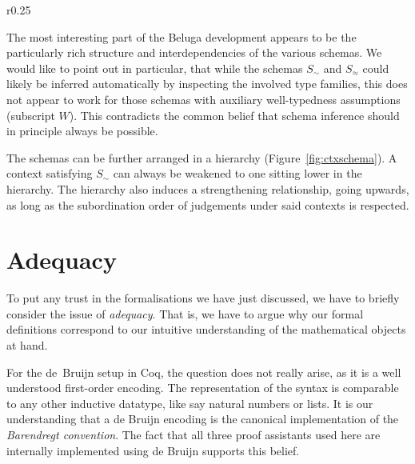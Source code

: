 \documentclass[a4paper,UKenglish]{lipics-v2016}
\newcommand{\tyr}{\mathrel{\sim}}
\newcommand{\tmr}{\mathrel{\approx}}
\theoremstyle{plain}
\begin{document}
\begin{wrapfigure}{r}{0.25\textwidth}
  \centering
  \vspace{-0.5em}
  \caption{Hierarchy of Context Schemas}
  \label{fig:ctxschema}
\end{wrapfigure}

The most interesting part of the Beluga development appears to be the particularly rich structure and interdependencies of the various schemas.
We would like to point out in particular, that while the schemas $S_{\tyr}$ and $S_{\tmr}$ could likely be inferred automatically by inspecting the involved type families, this does not appear to work for those schemas with auxiliary well-typedness assumptions (subscript $W$).
This contradicts the common belief that schema inference should in principle always be possible.

The schemas can be further arranged in a hierarchy (Figure~\ref{fig:ctxschema}).
A context satisfying $S_{\tyr}$ can always be weakened to one sitting lower in the hierarchy.
The hierarchy also induces a strengthening relationship, going upwards, as long as the subordination order of judgements under said contexts is respected.

\section{Adequacy}
\label{sec:adequacy}

To put any trust in the formalisations we have just discussed, we have to briefly consider the issue of \emph{adequacy}.
That is, we have to argue why our formal definitions correspond to our intuitive understanding of the mathematical objects at hand.

For the de~Bruijn setup in Coq, the question does not really arise, as it is a well understood first-order encoding.
The representation of the syntax is comparable to any other inductive datatype, like say natural numbers or lists.
It is our understanding that a de Bruijn encoding is the canonical implementation of the \emph{Barendregt convention}.
The fact that all three proof assistants used here are internally implemented using de Bruijn supports this belief.
\end{document}
